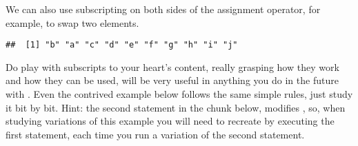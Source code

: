 \documentclass[krantz2]{krantz}\usepackage{knitr}
\begin{document}
We can also use subscripting on both sides of the assignment operator, for example, to swap two elements.

\begin{knitrout}\footnotesize
{}\color{fgcolor}\begin{kframe}
\begin{alltt}
 \hlkwb{<-} \hlstd{letters[}\hlopt{:}\hlstd{]}
\hlstd{a[}\hlopt{:}\hlstd{]} \hlkwb{<-} \hlstd{a[}\hlopt{:}\hlstd{]}
\end{alltt}
\begin{verbatim}
##  [1] "b" "a" "c" "d" "e" "f" "g" "h" "i" "j"
\end{verbatim}
\end{kframe}
\end{knitrout}

\begin{playground}
Do play with subscripts to your heart's content, really grasping how they work and how they can be used, will be very useful in anything you do in the future with \Rlang. Even the contrived example below follows the same simple rules, just study it bit by bit. Hint: the second statement in the chunk below, modifies , so, when studying variations of this example you will need to recreate  by executing the first statement, each time you run a variation of the second statement.

\begin{knitrout}\footnotesize
{}\color{fgcolor}\begin{kframe}
\begin{alltt}
 \hlkwb{<-} \hlstd{letters[}\hlopt{:}\hlstd{]}
\hlstd{a[}\hlopt{:}\hlstd{]} \hlkwb{<-} \hlstd{a[}\hlstd{(}\hlstd{,}\hlstd{)]}
\end{alltt}
\end{kframe}
\end{knitrout}

\end{playground}
\end{document}
